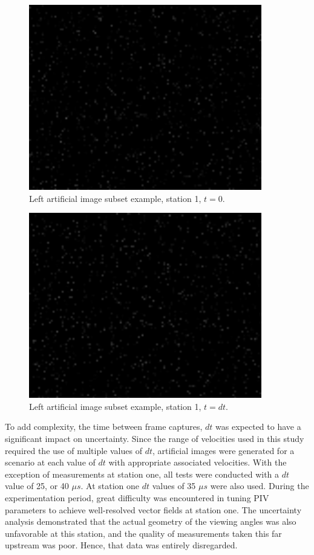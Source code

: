 \begin{figure}[H]
	\centering
	\includegraphics[width=4in]{figs/artificial_images/la}
	\caption{Left artificial image subset example, station 1, $t=0$.}
	\label{fig:la}
\end{figure}

\begin{figure}[H]
	\centering
	\includegraphics[width=4in]{figs/artificial_images/lb}
	\caption{Left artificial image subset example, station 1, $t=dt$.}
	\label{fig:lb}
\end{figure}

To add complexity, the time between frame captures, $dt$ was expected to have a 
significant impact on uncertainty. Since the range of velocities used in this 
study required the use of multiple values of $dt$, artificial images were 
generated for a scenario at each value of $dt$ with appropriate associated 
velocities. 
With the exception of measurements at station one, all tests were conducted 
with a $dt$ value of 25, or 40 $\mu s$. At station one $dt$ values of 35 
$\mu s$ were also used. During the experimentation period, great difficulty 
was encountered in tuning PIV parameters to achieve well-resolved vector fields 
at station one. The uncertainty analysis demonstrated that the actual geometry 
of the viewing angles was also unfavorable at this station, and the quality of 
measurements taken this far upstream was poor. Hence, that data was entirely 
disregarded.

